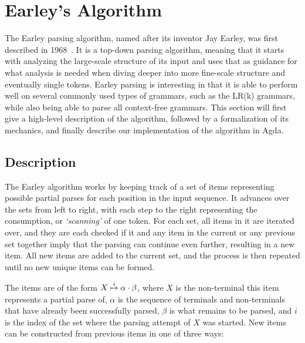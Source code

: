 
\chapter{Earley's Algorithm} \label{Earleys}

	The Earley parsing algorithm, named after its inventor Jay Earley, was
	first described in 1968~\cite{Earley}. It is a top-down parsing algorithm,
	meaning that it starts with analyzing the large-scale structure of its
	input and uses that as guidance for what analysis is needed when diving
	deeper into more fine-scale structure and eventually single tokens.  Earley
	parsing is interesting in that it is able to perform well on several
	commonly used types of grammars, such as the LR(k) grammars, while also
	being able to parse all context-free grammars. This section will first give
	a high-level description of the algorithm, followed by a formalization of
	its mechanics, and finally describe our implementation of the algorithm in
	Agda.

	\section{Description}

		The Earley algorithm works by keeping track of a set of items
		representing possible partial parses for each position in the input
		sequence. It advances over the sets from left to right, with each step
		to the right representing the consumption, or \emph{`scanning'} of one
		token. For each set, all items in it are iterated over, and they are
		each checked if it and any item in the current or any previous set
		together imply that the parsing can continue even further, resulting in
		a new item.
                All new items are added to the current set, and the process
		is then repeated until no new unique items can be formed.

		The items are of the form $X\overset{i}{\mapsto}\alpha\cdot\beta$, where
		$X$ is the non-terminal this item represents a partial
                parse of,
		$\alpha$ is the sequence of terminals and non-terminals that have
		already been successfully parsed, $\beta$ is what remains to be parsed,
		and $i$ is the index of the set where the parsing attempt of $X$ was
		started. New items can be constructed from previous items in one of
		three ways:

